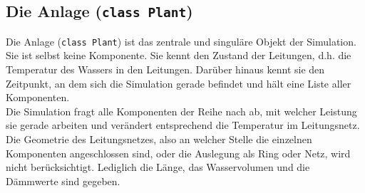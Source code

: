 \documentclass[12pt,a4paper]{article}
\begin{document}
\subsection{Die Anlage (\texttt{class Plant})}
Die Anlage (\texttt{class Plant}) ist das zentrale und singuläre Objekt der Simulation. Sie ist selbst keine Komponente. Sie kennt den Zustand der Leitungen, d.h. die Temperatur des Wassers in den Leitungen. Darüber hinaus kennt sie den Zeitpunkt, an dem sich die Simulation gerade befindet und hält eine Liste aller Komponenten.\\
Die Simulation fragt alle Komponenten der Reihe nach ab, mit welcher Leistung sie gerade arbeiten und verändert entsprechend die Temperatur im Leitungsnetz. Die Geometrie des Leitungsnetzes, also an welcher Stelle die einzelnen Komponenten angeschlossen sind, oder die Auslegung als Ring oder Netz, wird nicht berücksichtigt. Lediglich die Länge, das Wasservolumen und die Dämmwerte sind gegeben.\\
\end{document}
